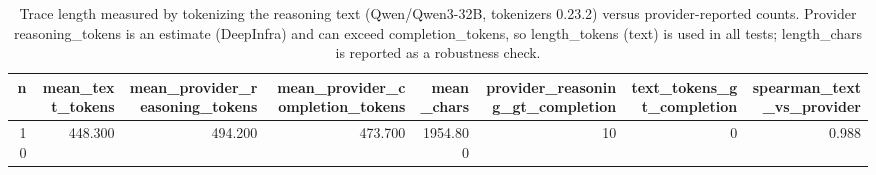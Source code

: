 \begin{table}[htbp]
\caption{Trace length measured by tokenizing the reasoning text (Qwen/Qwen3-32B, tokenizers 0.23.2) versus provider-reported counts. Provider reasoning\_tokens is an estimate (DeepInfra) and can exceed completion\_tokens, so length\_tokens (text) is used in all tests; length\_chars is reported as a robustness check.}
\label{tab:task2_length_validation}
\begin{tabular}{rrrrrrrr}
\toprule
n & mean\_text\_tokens & mean\_provider\_reasoning\_tokens & mean\_provider\_completion\_tokens & mean\_chars & provider\_reasoning\_gt\_completion & text\_tokens\_gt\_completion & spearman\_text\_vs\_provider \\
\midrule
10 & 448.300 & 494.200 & 473.700 & 1954.800 & 10 & 0 & 0.988 \\
\bottomrule
\end{tabular}
\end{table}
